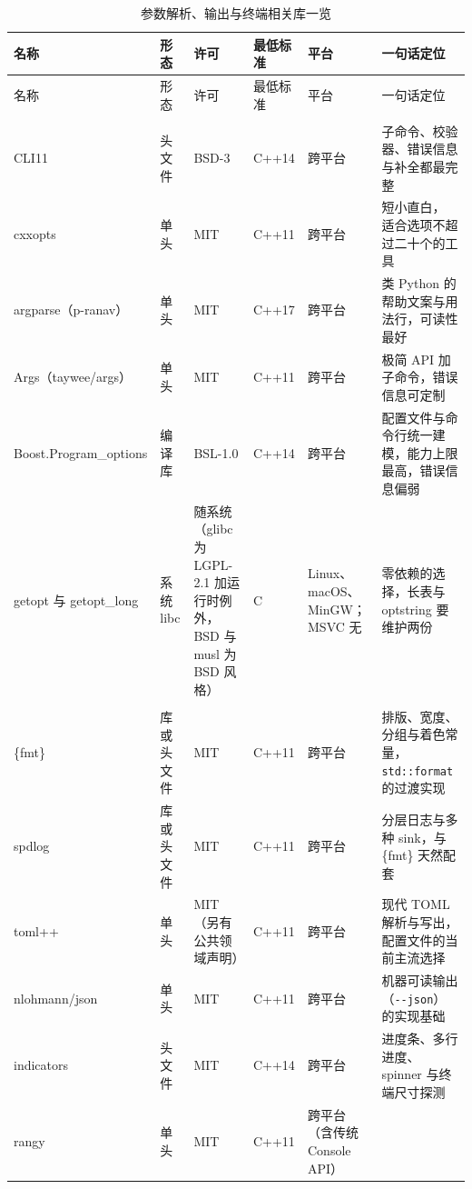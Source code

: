 \documentclass[12pt,a4paper,fontset=fandol]{ctexbook}
\newcommand{\cpp}[1]{C++#1}
\newcommand{\Opt}[1]{\texttt{-\/-#1}}
\newcommand{\Bk}{\allowbreak}
\begin{document}
\begin{longtable}{@{}>{\raggedright\arraybackslash}p{}
                 >{\raggedright\arraybackslash}p{}
                 >{\raggedright\arraybackslash}p{}
                 >{\raggedright\arraybackslash}p{}
                 >{\raggedright\arraybackslash}p{}
                 >{\raggedright\arraybackslash}p{}@{}}
\caption{参数解析、输出与终端相关库一览}
\label{tab:libs} \\
\toprule
名称 & 形态 & 许可 & 最低标准 & 平台 & 一句话定位 \\
\midrule
\endfirsthead
\toprule
名称 & 形态 & 许可 & 最低标准 & 平台 & 一句话定位 \\
\midrule
\endhead
\multicolumn{6}{@{}l}{\textbf{参数解析}}\\
CLI11 & 头文件 & BSD-3 & \cpp{14} & 跨平台 &
子命令、校验器、错误信息与补全都最完整 \\
cxxopts & 单头 & MIT & \cpp{11} & 跨平台 & 短小直白，
适合选项不超过二十个的工具 \\
argparse（p-ranav） & 单头 & MIT & \cpp{17} & 跨平台 &
类 Python 的帮助文案与用法行，可读性最好 \\
Args（taywee/args） & 单头 & MIT & \cpp{11} & 跨平台 &
极简 API 加子命令，错误信息可定制 \\
Boost\Bk.Program\Bk\_options & 编译库 & BSL-1.0 & \cpp{14} & 跨平台 &
配置文件与命令行统一建模，能力上限最高，错误信息偏弱 \\
getopt 与 getopt\_long & 系统 libc & 随系统（glibc 为 LGPL-2.1
加运行时例外，BSD 与 musl 为 BSD 风格） & C & Linux、macOS、
MinGW；MSVC 无 & 零依赖的选择，长表与 optstring 要维护两份 \\
\multicolumn{6}{@{}l}{\textbf{输出、日志与配置}}\\
\{fmt\} & 库或头文件 & MIT & \cpp{11} & 跨平台 &
排版、宽度、分组与着色常量，\lstinline|std::format| 的过渡实现 \\
spdlog & 库或头文件 & MIT & \cpp{11} & 跨平台 &
分层日志与多种 sink，与 \{fmt\} 天然配套 \\
toml++ & 单头 & MIT（另有公共领域声明） & \cpp{11} & 跨平台 &
现代 TOML 解析与写出，配置文件的当前主流选择 \\
nlohmann\Bk/json & 单头 & MIT & \cpp{11} & 跨平台 &
机器可读输出（\Opt{json}）的实现基础 \\
indicators & 头文件 & MIT & \cpp{14} & 跨平台 &
进度条、多行进度、spinner 与终端尺寸探测 \\
rangy & 单头 & MIT & \cpp{11} & 跨平台（含传统 Console API） &

\end{longtable}
\end{document}
